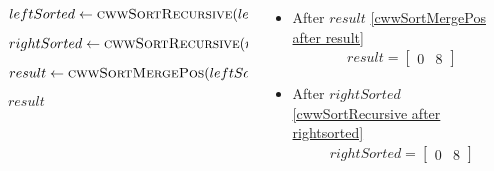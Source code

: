 \begin{frame}[containsverbatim]{\cwwalgortihmexampleframe}
\begin{columns}[c]
\begin{column}{0.35\textwidth}
{\begin{minipage}[c]{\textwidth}
\begin{algorithm}[H]
\begin{algorithmic}[1]
                                            \label{cwwSortRecursive before leftsorted}
                                            \State $leftSorted \gets \Call{cwwSortRecursive}{left}$
                                            \label{cwwSortRecursive after leftsorted}
                                            
                                            \label{cwwSortRecursive before rightsorted}
                                            \State $rightSorted \gets \Call{cwwSortRecursive}{right}$
                                            \label{cwwSortRecursive after rightsorted}

                                            \label{cwwSortRecursive before result}
                                            \State $result \gets \Call{cwwSortMergePos}{leftSorted, rightSorted}$
                                            \label{cwwSortRecursive after result}
                
                                            \State \Return $result$
                                        \EndFunction
                                    \end{algorithmic}
                                \end{algorithm}
                            \endgroup
                        \end{minipage}
                    }
                \end{column}

                \begin{column}{0.65\textwidth}
                    \vspace{-0.4cm}
                    \scriptsize
                        \begin{itemize}
                            \item After $result$ \cref{cwwSortMergePos after result}
                            \begin{align*}
                                result = \begin{bmatrix}0 & 8\end{bmatrix}
                            \end{align*}

                            \item After $rightSorted$ \cref{cwwSortRecursive after rightsorted}
                            \begin{align*}
                                rightSorted = \begin{bmatrix}0 & 8\end{bmatrix}
                            \end{align*}


\end{itemize}
\end{column}
\end{columns}
\end{frame}
